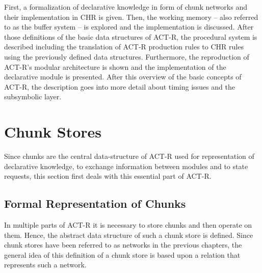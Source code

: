 First, a formalization of declarative knowledge in form of chunk networks and their implementation in CHR is given. Then, the working memory -- also referred to as the buffer system -- is explored and the implementation is discussed. After those definitions of the basic data structures of ACT-R, the procedural system is described including the translation of ACT-R production rules to CHR rules using the previously defined data structures. Furthermore, the reproduction of ACT-R's modular architecture is shown and the implementation of the declarative module is presented. After this overview of the basic concepts of ACT-R, the description goes into more detail about timing issues and the subsymbolic layer.

\section{Chunk Stores}
\label{implementation:chunk_stores}

Since chunks are the central data-structure of ACT-R used for representation of declarative knowledge, to exchange information between modules and to state requests, this section first deals with this essential part of ACT-R.

\subsection{Formal Representation of Chunks}

In multiple parts of ACT-R it is necessary to store chunks and then operate on them. Hence, the abstract data structure of such a chunk store is defined. Since chunk stores have been referred to as networks in the previous chapters, the general idea of this definition of a chunk store is based upon a relation that represents such a network.

